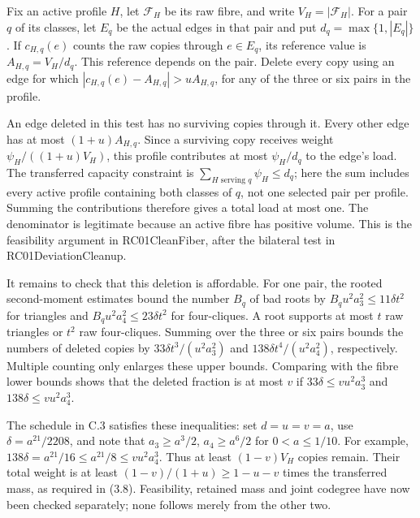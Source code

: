 \documentclass[english,11pt,a4paper]{article}
\newcounter{none}
\begin{document}
Fix an active profile \(H\), let \(\mathcal F_H\) be its raw fibre, and write \(V_H=|\mathcal F_H|\). For a pair \(q\) of its classes, let \(E_q\) be the actual edges in that pair and put \(d_q=\max\{1,|E_q|\}\). If \(c_{H,q}(e)\) counts the raw copies through \(e\in E_q\), its reference value is \(A_{H,q}=V_H/d_q\). This reference depends on the pair. Delete every copy using an edge for which \(|c_{H,q}(e)-A_{H,q}|>uA_{H,q}\), for any of the three or six pairs in the profile.

An edge deleted in this test has no surviving copies through it. Every other edge has at most \((1+u)A_{H,q}\). Since a surviving copy receives weight \(\psi_H/((1+u)V_H)\), this profile contributes at most \(\psi_H/d_q\) to the edge's load. The transferred capacity constraint is \(\sum_{H\text{ serving }q}\psi_H\le d_q\); here the sum includes every active profile containing both classes of \(q\), not one selected pair per profile. Summing the contributions therefore gives a total load at most one. The denominator is legitimate because an active fibre has positive volume. This is the feasibility argument in {\ttfamily\small RC01CleanFib\discretionary{\hbox{\ensuremath{\hookrightarrow}}}{}{}er}, after the bilateral test in {\ttfamily\small RC01Deviatio\discretionary{\hbox{\ensuremath{\hookrightarrow}}}{}{}nCleanup}.

It remains to check that this deletion is affordable. For one pair, the rooted second-moment estimates bound the number \(B_q\) of bad roots by \(B_qu^2a_3^2\le11\delta t^2\) for triangles and \(B_qu^2a_4^2\le23\delta t^2\) for four-cliques. A root supports at most \(t\) raw triangles or \(t^2\) raw four-cliques. Summing over the three or six pairs bounds the numbers of deleted copies by \(33\delta t^3/(u^2a_3^2)\) and \(138\delta t^4/(u^2a_4^2)\), respectively. Multiple counting only enlarges these upper bounds. Comparing with the fibre lower bounds shows that the deleted fraction is at most \(v\) if \(33\delta\le vu^2a_3^3\) and \(138\delta\le vu^2a_4^3\).

The schedule in C.3 satisfies these inequalities: set \(d=u=v=a\), use \(\delta=a^{21}/2208\), and note that \(a_3\ge a^3/2\), \(a_4\ge a^6/2\) for \(0<a\le1/10\). For example, \(138\delta=a^{21}/16\le a^{21}/8\le vu^2a_4^3\). Thus at least \((1-v)V_H\) copies remain. Their total weight is at least \((1-v)/(1+u)\ge1-u-v\) times the transferred mass, as required in (3.8). Feasibility, retained mass and joint codegree have now been checked separately; none follows merely from the other two.
\end{document}
